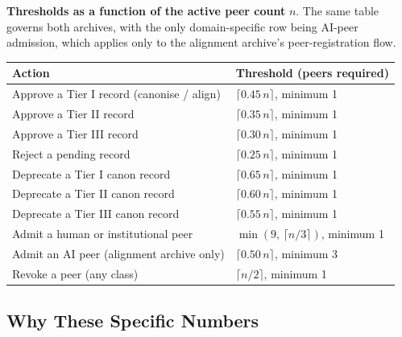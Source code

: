 \documentclass[11pt,a4paper]{article}
\begin{document}
\begin{plainbox}
\textbf{Thresholds as a function of the active peer count} $n$.
The same table governs both archives, with the only
domain-specific row being AI-peer admission, which applies
only to the alignment archive's peer-registration flow.
\vspace{0.3em}
\begin{tabular}{@{}p{7.6cm} p{7cm}@{}}
\toprule
\textbf{Action}                                          & \textbf{Threshold (peers required)} \\
\midrule
Approve a Tier I record (canonise / align)               & $\lceil 0.45\, n \rceil$, minimum 1 \\
Approve a Tier II record                                 & $\lceil 0.35\, n \rceil$, minimum 1 \\
Approve a Tier III record                                & $\lceil 0.30\, n \rceil$, minimum 1 \\
Reject a pending record                                  & $\lceil 0.25\, n \rceil$, minimum 1 \\
Deprecate a Tier I canon record                          & $\lceil 0.65\, n \rceil$, minimum 1 \\
Deprecate a Tier II canon record                         & $\lceil 0.60\, n \rceil$, minimum 1 \\
Deprecate a Tier III canon record                        & $\lceil 0.55\, n \rceil$, minimum 1 \\
Admit a human or institutional peer                      & $\min(9,\,\lceil n/3 \rceil)$, minimum 1 \\
Admit an AI peer (alignment archive only)                & $\lceil 0.50\, n \rceil$, minimum 3 \\
Revoke a peer (any class)                                & $\lceil n/2 \rceil$, minimum 1 \\
\bottomrule
\end{tabular}
\end{plainbox}

\subsection{Why These Specific Numbers}
\end{document}

